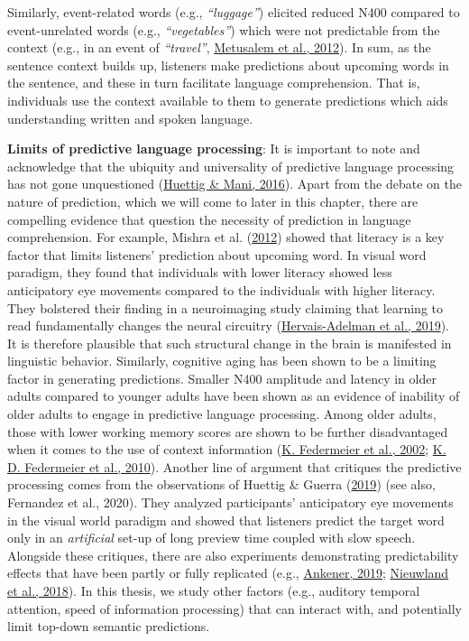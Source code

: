 \documentclass[a4paper, nobind]{templates/ociamthesis}
\begin{document}
Similarly, event-related words (e.g., \emph{``luggage''}) elicited reduced N400 compared to event-unrelated words (e.g., \emph{``vegetables''}) which were not predictable from the context (e.g., in an event of \emph{``travel''}, \protect\hyperlink{ref-Metusalem2012}{Metusalem et al., 2012}).
In sum, as the sentence context builds up, listeners make predictions about upcoming words in the sentence, and these in turn facilitate language comprehension.
That is, individuals use the context available to them to generate predictions which aids understanding written and spoken language.

\textbf{Limits of predictive language processing}:
It is important to note and acknowledge that the ubiquity and universality of predictive language processing has not gone unquestioned (\protect\hyperlink{ref-Huettig2016}{Huettig \& Mani, 2016}).
Apart from the debate on the nature of prediction, which we will come to later in this chapter, there are compelling evidence that question the necessity of prediction in language comprehension.
For example, Mishra et al. (\protect\hyperlink{ref-Mishra2012}{2012}) showed that literacy is a key factor that limits listeners' prediction about upcoming word.
In visual word paradigm, they found that individuals with lower literacy showed less anticipatory eye movements compared to the individuals with higher literacy.
They bolstered their finding in a neuroimaging study claiming that learning to read fundamentally changes the neural circuitry (\protect\hyperlink{ref-Hervais2019}{Hervais-Adelman et al., 2019}).
It is therefore plausible that such structural change in the brain is manifested in linguistic behavior.
Similarly, cognitive aging has been shown to be a limiting factor in generating predictions.
Smaller N400 amplitude and latency in older adults compared to younger adults have been shown as an evidence of inability of older adults to engage in predictive language processing.
Among older adults, those with lower working memory scores are shown to be further disadvantaged when it comes to the use of context information (\protect\hyperlink{ref-Federmeier2002}{K. Federmeier et al., 2002}; \protect\hyperlink{ref-Federmeier2010}{K. D. Federmeier et al., 2010}).
Another line of argument that critiques the predictive processing comes from the observations of Huettig \& Guerra (\protect\hyperlink{ref-Huettig2019}{2019}) (see also, Fernandez et al., 2020).
They analyzed participants' anticipatory eye movements in the visual world paradigm and showed that listeners predict the target word only in an \emph{artificial} set-up of long preview time coupled with slow speech.
Alongside these critiques, there are also experiments demonstrating predictability effects that have been partly or fully replicated (e.g., \protect\hyperlink{ref-Ankener2019}{Ankener, 2019}; \protect\hyperlink{ref-Nieuwland2018}{Nieuwland et al., 2018}).
In this thesis, we study other factors (e.g., auditory temporal attention, speed of information processing) that can interact with, and potentially limit top-down semantic predictions.
\end{document}

